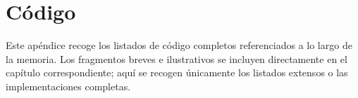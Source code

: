 \chapter{Código}
\label{cha:codigo}

Este apéndice recoge los listados de código completos referenciados a lo largo de la
memoria. Los fragmentos breves e ilustrativos se incluyen directamente en el capítulo
correspondiente; aquí se recogen únicamente los listados extensos o las implementaciones
completas.


